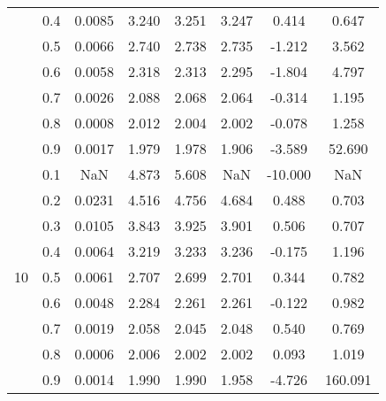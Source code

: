 \documentclass[11pt,a4paper]{report}
\begin{document}
\begin{longtable}{ | c | c || c | c | c | c | c | c | }
 & 0.4 & 0.0085 & 3.240 & 3.251 & 3.247 & 0.414 & 0.647 \\
 & 0.5 & 0.0066 & 2.740 & 2.738 & 2.735 & -1.212 & 3.562 \\
 & 0.6 & 0.0058 & 2.318 & 2.313 & 2.295 & -1.804 & 4.797 \\
 & 0.7 & 0.0026 & 2.088 & 2.068 & 2.064 & -0.314 & 1.195 \\
 & 0.8 & 0.0008 & 2.012 & 2.004 & 2.002 & -0.078 & 1.258 \\
 & 0.9 & 0.0017 & 1.979 & 1.978 & 1.906 & -3.589 & 52.690 \\
 \hline
\multirow{9}{*}{10} & 0.1 & NaN & 4.873 & 5.608 & NaN & -10.000 & NaN \\
 & 0.2 & 0.0231 & 4.516 & 4.756 & 4.684 & 0.488 & 0.703 \\
 & 0.3 & 0.0105 & 3.843 & 3.925 & 3.901 & 0.506 & 0.707 \\
 & 0.4 & 0.0064 & 3.219 & 3.233 & 3.236 & -0.175 & 1.196 \\
 & 0.5 & 0.0061 & 2.707 & 2.699 & 2.701 & 0.344 & 0.782 \\
 & 0.6 & 0.0048 & 2.284 & 2.261 & 2.261 & -0.122 & 0.982 \\
 & 0.7 & 0.0019 & 2.058 & 2.045 & 2.048 & 0.540 & 0.769 \\
 & 0.8 & 0.0006 & 2.006 & 2.002 & 2.002 & 0.093 & 1.019 \\
 & 0.9 & 0.0014 & 1.990 & 1.990 & 1.958 & -4.726 & 160.091 \\
 \hline
\hline
\end{longtable}
\end{document}
